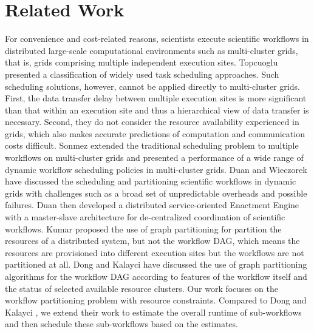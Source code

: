 \section{Related Work}
For convenience and cost-related reasons, scientists execute scientific workflows \cite{Bharathi2008, Rubing2005} in distributed large-scale computational environments such as multi-cluster grids, that is, grids comprising multiple independent execution sites. Topcuoglu \cite{Topcuoglu2002} presented a classification of widely used task scheduling approaches. Such scheduling solutions, however, cannot be applied directly to multi-cluster grids. First, the data transfer delay between multiple execution sites is more significant than that within an execution site and thus a hierarchical view of data transfer is necessary. Second, they do not consider the resource availability experienced in grids, which also makes accurate predictions of computation and communication costs difficult. Sonmez \cite{Sonmez2010} extended the traditional scheduling problem to multiple workflows on multi-cluster grids and presented a performance of a wide range of dynamic workflow scheduling policies in multi-cluster grids. Duan \cite{Rubing2005} and Wieczorek \cite{Wieczorek2005} have discussed the scheduling and partitioning scientific workflows in dynamic grids with challenges such as a broad set of unpredictable overheads and possible failures. Duan \cite{Rubing2005} then developed a distributed service-oriented Enactment Engine with a master-slave architecture for de-centralized coordination of scientific workflows. Kumar \cite{Kumar2002} proposed the use of graph partitioning for partition the resources of a distributed system, but not the workflow DAG, which means the resources are provisioned into different execution sites but the workflows are not partitioned at all. Dong \cite{Dong2007} and Kalayci \cite{Kalayci2010} have discussed the use of graph partitioning algorithms for the workflow DAG according to features of the workflow itself and the status of selected available resource clusters. Our work focuses on the workflow partitioning problem with resource constraints. Compared to Dong \cite{Dong2007} and Kalayci \cite{Kalayci2010}, we extend their work to estimate the overall runtime of sub-workflows and then schedule these sub-workflows based on the estimates. 

